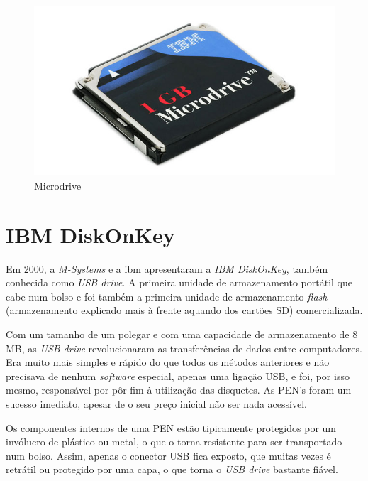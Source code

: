 \documentclass{report}
\begin{document}
	\begin{figure} [h]
		\centering
		\includegraphics[scale=0.3]{microdrive.jpg}
		\caption{Microdrive}
	\end{figure}

\newpage
		
		\section{IBM DiskOnKey}	
		
		Em 2000, a \textit{M-Systems} e a \ac{ibm} apresentaram a \textit{IBM DiskOnKey}, também conhecida como \textit{USB drive}. A primeira unidade de armazenamento portátil que cabe num bolso e foi também a primeira unidade de armazenamento \textit{flash}  (armazenamento explicado mais à frente aquando dos cartões SD) comercializada.
\vspace{3mm}		
		 
	Com um tamanho de um polegar e com uma capacidade de armazenamento de 8 MB, as \textit{USB drive} revolucionaram as transferências de dados entre computadores. Era muito mais simples e rápido do que todos os métodos anteriores e não precisava de nenhum \textit{software} especial, apenas uma ligação USB, e foi, por isso mesmo, responsável por pôr fim à utilização das disquetes. As PEN's foram um sucesso imediato, apesar de o seu preço inicial não ser nada acessível.
\vspace{3mm}
	
	Os componentes internos de uma PEN estão tipicamente protegidos por um invólucro de plástico ou metal, o que o torna resistente para ser transportado num bolso. Assim, apenas o conector USB fica exposto, que muitas vezes é retrátil ou protegido por uma capa, o que torna o \textit{USB drive} bastante fiável.

\vspace{10mm}
\end{document}
